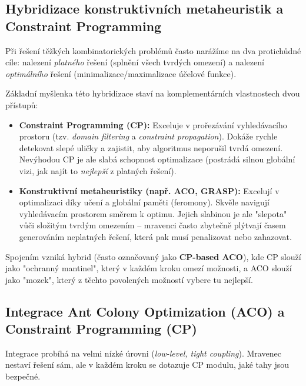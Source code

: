 \documentclass[12pt,a4paper]{article}
\theoremstyle{definition}
\begin{document}
\subsection{Hybridizace konstruktivních metaheuristik a Constraint Programming}
Při řešení těžkých kombinatorických problémů často narážíme na dva protichůdné cíle: nalezení \textit{platného} řešení (splnění všech tvrdých omezení) a nalezení \textit{optimálního} řešení (minimalizace/maximalizace účelové funkce). 

Základní myšlenka této hybridizace staví na komplementárních vlastnostech dvou přístupů:
\begin{itemize}
    \item \textbf{Constraint Programming (CP):} Exceluje v prořezávání vyhledávacího prostoru (tzv. \textit{domain filtering} a \textit{constraint propagation}). Dokáže rychle detekovat slepé uličky a zajistit, aby algoritmus neporušil tvrdá omezení. Nevýhodou CP je ale slabá schopnost optimalizace (postrádá silnou globální vizi, jak najít to \textit{nejlepší} z platných řešení). 
    \item \textbf{Konstruktivní metaheuristiky (např. ACO, GRASP):} Excelují v optimalizaci díky učení a globální paměti (feromony). Skvěle navigují vyhledávacím prostorem směrem k optimu. Jejich slabinou je ale "slepota" vůči složitým tvrdým omezením – mravenci často zbytečně plýtvají časem generováním neplatných řešení, která pak musí penalizovat nebo zahazovat.
\end{itemize}

Spojením vzniká hybrid (často označovaný jako \textbf{CP-based ACO}), kde CP slouží jako "ochranný mantinel", který v každém kroku omezí možnosti, a ACO slouží jako "mozek", který z těchto povolených možností vybere tu nejlepší.

\subsection{Integrace Ant Colony Optimization (ACO) a Constraint Programming (CP)}
Integrace probíhá na velmi nízké úrovni (\textit{low-level, tight coupling}). Mravenec nestaví řešení sám, ale v každém kroku se dotazuje CP modulu, jaké tahy jsou bezpečné. 
\end{document}
